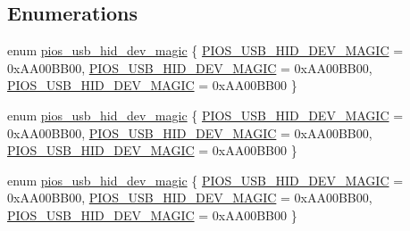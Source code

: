 \subsection*{Enumerations}
\begin{DoxyCompactItemize}
\item 
enum \hyperlink{group___p_i_o_s___u_s_b___h_i_d_ga7769ddfbb58cbf13d0e0662f4d441899}{pios\-\_\-usb\-\_\-hid\-\_\-dev\-\_\-magic} \{ \hyperlink{group___p_i_o_s___u_s_b___h_i_d_gga7769ddfbb58cbf13d0e0662f4d441899a5e6367f95628a33741ecc295bcaed279}{P\-I\-O\-S\-\_\-\-U\-S\-B\-\_\-\-H\-I\-D\-\_\-\-D\-E\-V\-\_\-\-M\-A\-G\-I\-C} = 0x\-A\-A00\-B\-B00, 
\hyperlink{group___p_i_o_s___u_s_b___h_i_d_gga7769ddfbb58cbf13d0e0662f4d441899a5e6367f95628a33741ecc295bcaed279}{P\-I\-O\-S\-\_\-\-U\-S\-B\-\_\-\-H\-I\-D\-\_\-\-D\-E\-V\-\_\-\-M\-A\-G\-I\-C} = 0x\-A\-A00\-B\-B00, 
\hyperlink{group___p_i_o_s___u_s_b___h_i_d_gga7769ddfbb58cbf13d0e0662f4d441899a5e6367f95628a33741ecc295bcaed279}{P\-I\-O\-S\-\_\-\-U\-S\-B\-\_\-\-H\-I\-D\-\_\-\-D\-E\-V\-\_\-\-M\-A\-G\-I\-C} = 0x\-A\-A00\-B\-B00
 \}
\item 
enum \hyperlink{group___p_i_o_s___u_s_b___h_i_d_ga7769ddfbb58cbf13d0e0662f4d441899}{pios\-\_\-usb\-\_\-hid\-\_\-dev\-\_\-magic} \{ \hyperlink{group___p_i_o_s___u_s_b___h_i_d_gga7769ddfbb58cbf13d0e0662f4d441899a5e6367f95628a33741ecc295bcaed279}{P\-I\-O\-S\-\_\-\-U\-S\-B\-\_\-\-H\-I\-D\-\_\-\-D\-E\-V\-\_\-\-M\-A\-G\-I\-C} = 0x\-A\-A00\-B\-B00, 
\hyperlink{group___p_i_o_s___u_s_b___h_i_d_gga7769ddfbb58cbf13d0e0662f4d441899a5e6367f95628a33741ecc295bcaed279}{P\-I\-O\-S\-\_\-\-U\-S\-B\-\_\-\-H\-I\-D\-\_\-\-D\-E\-V\-\_\-\-M\-A\-G\-I\-C} = 0x\-A\-A00\-B\-B00, 
\hyperlink{group___p_i_o_s___u_s_b___h_i_d_gga7769ddfbb58cbf13d0e0662f4d441899a5e6367f95628a33741ecc295bcaed279}{P\-I\-O\-S\-\_\-\-U\-S\-B\-\_\-\-H\-I\-D\-\_\-\-D\-E\-V\-\_\-\-M\-A\-G\-I\-C} = 0x\-A\-A00\-B\-B00
 \}
\item 
enum \hyperlink{group___p_i_o_s___u_s_b___h_i_d_ga7769ddfbb58cbf13d0e0662f4d441899}{pios\-\_\-usb\-\_\-hid\-\_\-dev\-\_\-magic} \{ \hyperlink{group___p_i_o_s___u_s_b___h_i_d_gga7769ddfbb58cbf13d0e0662f4d441899a5e6367f95628a33741ecc295bcaed279}{P\-I\-O\-S\-\_\-\-U\-S\-B\-\_\-\-H\-I\-D\-\_\-\-D\-E\-V\-\_\-\-M\-A\-G\-I\-C} = 0x\-A\-A00\-B\-B00, 
\hyperlink{group___p_i_o_s___u_s_b___h_i_d_gga7769ddfbb58cbf13d0e0662f4d441899a5e6367f95628a33741ecc295bcaed279}{P\-I\-O\-S\-\_\-\-U\-S\-B\-\_\-\-H\-I\-D\-\_\-\-D\-E\-V\-\_\-\-M\-A\-G\-I\-C} = 0x\-A\-A00\-B\-B00, 
\hyperlink{group___p_i_o_s___u_s_b___h_i_d_gga7769ddfbb58cbf13d0e0662f4d441899a5e6367f95628a33741ecc295bcaed279}{P\-I\-O\-S\-\_\-\-U\-S\-B\-\_\-\-H\-I\-D\-\_\-\-D\-E\-V\-\_\-\-M\-A\-G\-I\-C} = 0x\-A\-A00\-B\-B00
 \}
\end{DoxyCompactItemize}
